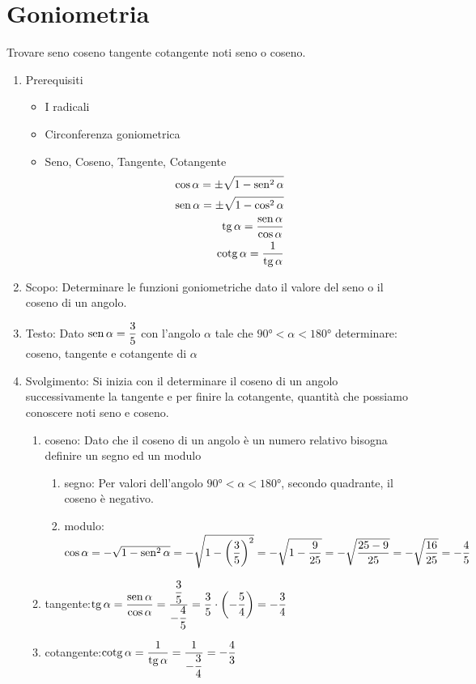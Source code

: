 \section{Goniometria}
\label{sec:EsempiGoniometria}
\begin{table}[H]
	\caption{Trovare seno coseno tangente cotangente noti seno o coseno.}
	\label{tab:trovaresencosnoti}
\begin{enumerate}
	\item Prerequisiti 
\begin{itemize}
	\item I radicali
	\item Circonferenza goniometrica
	\item Seno, Coseno, Tangente, Cotangente
  \begin {align*}
	\cos\alpha=\pm\sqrt{1-\operatorname{sen}^2\alpha}\\
	\operatorname{sen}\alpha=\pm\sqrt{1-\cos^2\alpha}\\
	\operatorname{tg}\alpha=\dfrac{\operatorname{sen}\alpha}{\cos\alpha}\\
	\operatorname{cotg}\alpha=\dfrac{1}{\operatorname{tg}\alpha}
	\end{align*}
\end{itemize}
  \item Scopo: Determinare le funzioni goniometriche dato il valore del seno o il coseno di un angolo.
  \item Testo: Dato $\operatorname{sen}\alpha=\dfrac{3}{5}$ con l'angolo $\alpha$ tale che $\ang{90}<\alpha<\ang{180}$ determinare: coseno, tangente e cotangente di $\alpha$
  \item Svolgimento: Si inizia con il determinare il coseno di un angolo successivamente la tangente e per finire la cotangente, quantità che possiamo conoscere noti seno e coseno. 
  \begin{enumerate}
	\item coseno: Dato che il coseno di un angolo è un numero relativo bisogna definire un segno ed un modulo
	\begin{enumerate}
	\item segno: Per valori dell'angolo  $\ang{90}<\alpha<\ang{180}$, secondo quadrante, il coseno è negativo. 
	\item modulo: $\cos\alpha=-\sqrt{1-\operatorname{sen}^2\alpha}=-\sqrt{1-\left(\dfrac{3}{5}\right)^2}=-\sqrt{1-\dfrac{9}{25}}=-\sqrt{\dfrac{25-9}{25}}=-\sqrt{\dfrac{16}{25}}=-\dfrac{4}{5}$
\end{enumerate}
	\item tangente:$\operatorname{tg}\alpha=\dfrac{\operatorname{sen}\alpha}{\cos\alpha}=\dfrac{\dfrac{3}{5}}{-\dfrac{4}{5}}=\dfrac{3}{5}\cdot\left(-\dfrac{5}{4} \right)=-\dfrac{3}{4}$
  \item cotangente:$\operatorname{cotg}\alpha=\dfrac{1}{\operatorname{tg}\alpha}=\dfrac{1}{-\dfrac{3}{4}}=-\dfrac{4}{3}$
\end{enumerate}
 \end{enumerate}
\end{table}
